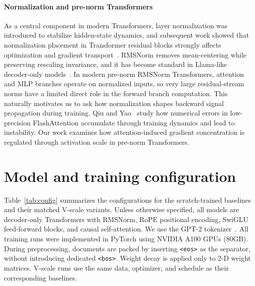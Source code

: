 \documentclass{article}
\theoremstyle{plain}
\theoremstyle{definition}
\theoremstyle{remark}
\begin{document}
\paragraph{Normalization and pre-norm Transformers}
As a central component in modern Transformers, layer normalization was introduced to stabilize hidden-state dynamics, and subsequent work showed that normalization placement in Transformer residual blocks strongly affects optimization and gradient transport~\cite{ba2016layernorm,xiong2020layernorm}. 
RMSNorm removes mean-centering while preserving rescaling invariance, and it has become standard in Llama-like decoder-only models~\cite{zhang2019rmsnorm,touvron2023llama,grattafiori2024llama3herdmodels,qwen2.5,qwen3,glm2024chatglm}.
In modern pre-norm RMSNorm Transformers, attention and MLP branches operate on normalized inputs, so very large residual-stream norms have a limited direct role in the forward branch computation. This naturally motivates us to ask how normalization shapes backward signal propagation during training.
Qiu and Yao~\cite{qiu2026flash} study how numerical errors in low-precision FlashAttention accumulate through training dynamics and lead to instability. Our work examines how attention-induced gradient concentration is regulated through activation scale in pre-norm Transformers.

\clearpage

\section{Model and training configuration}\label{app:config}

Table~\ref{tab:config} summarizes the configurations for the scratch-trained baselines and their matched V-scale variants. Unless otherwise specified, all models are decoder-only Transformers with RMSNorm, RoPE positional encoding, SwiGLU feed-forward blocks, and causal self-attention. We use the GPT-2 tokenizer~\cite{radford2019language}. All training runs were implemented in PyTorch using NVIDIA A100 GPUs (80GB). During preprocessing, documents are packed by inserting \texttt{<eos>} as the separator, without introducing dedicated \texttt{<bos>}. Weight decay is applied only to 2-D weight matrices. V-scale runs use the same data, optimizer, and schedule as their corresponding baselines.
\end{document}
